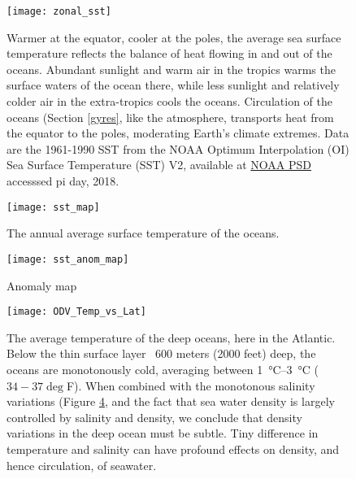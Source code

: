 \documentclass[amstex,12pt]{book}
\begin{document}
{\newpage
\begin{figure}[p]
\centering
  \texttt{[image: zonal\_sst]}%
\caption{Warmer at the equator, cooler at the poles, the average sea surface temperature reflects the balance of heat flowing in and out of the oceans. Abundant sunlight and warm air in the tropics warms the surface waters of the ocean there, while less sunlight and relatively colder air in the extra-tropics cools the oceans. Circulation of the oceans (Section \ref{gyres}, like the atmosphere, transports heat from the equator to the poles, moderating Earth's climate extremes. Data are the 1961-1990 SST from the NOAA Optimum Interpolation (OI) Sea Surface Temperature (SST) V2, available at \href{https://www.esrl.noaa.gov/psd/data/gridded/data.noaa.oisst.v2.html}{NOAA PSD} accesssed pi day, 2018.}
\label{fig:zonal_sst}
\end{figure}

\newpage
\begin{figure}[p]
\centering
  \texttt{[image: sst\_map]}%
\caption{The annual average surface temperature of the oceans.}
\label{fig:sst_map}
\end{figure}


\begin{figure}[p]
\centering
  \texttt{[image: sst\_anom\_map]}%
\caption{Anomaly map}
\label{fig:sst_anom_map}
\end{figure}



\newpage
\begin{figure}[p]
\centering
  \texttt{[image: ODV\_Temp\_vs\_Lat]}%
\caption{The average temperature of the deep oceans, here in the Atlantic. Below the thin surface layer ~600 meters (2000 feet) deep, the oceans are monotonously cold, averaging between \SIrange{1}{3}{\celsius} ($34-37 \deg$F). When combined with the monotonous salinity variations (Figure \ref{fig:salinity_sect}, and the fact that sea water density is largely controlled by salinity and density, we conclude that density variations in the deep ocean must be subtle. Tiny difference in temperature and salinity can have profound effects on density, and hence circulation, of seawater.}
\label{fig:salinity_sect}
\end{figure}

}
\end{document}
